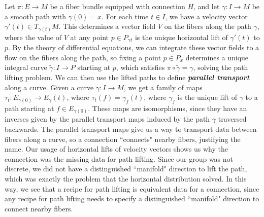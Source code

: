 \documentclass[abstract=on,twoside]{scrreprt}
\begin{document}
Let $\pi : E \to M$ be a fiber bundle equipped with connection $H$, and let
$\gamma : I \to M$ be a smooth path with $\gamma(0) = x$. For each time $t \in I$,
we have a velocity vector $\gamma'(t) \in T_{\gamma(t)}M$. This determines a vector
field $V$ on the fibers along the path $\gamma$, where the value of $V$ at any point
$p \in P_{\gamma{t}}$ is the unique horizontal lift of $\gamma'(t)$ to $p$. By
the theory of differential equations, we can integrate these vector fields to a flow
on the fibers along the path, so fixing a point $p \in P_x$ determines a
unique integral curve $\widetilde{\gamma} : I \to P$ starting at $p$, which satisfies
$\pi \circ \widetilde{\gamma} = \gamma$, solving the path lifting problem. We
can then use the lifted paths to define \textbf{\textit{parallel transport}} along
a curve. Given a curve $\gamma : I \to M$, we get a family of maps
$\tau_t : E_{\gamma(0)} \to E_{\gamma}(t)$, where $\tau_t(f) = \gamma_f(t)$, where
$\gamma_f$ is the unique lift of $\gamma$ to a path starting at $f \in E_{\gamma(0)}$.
These maps are isomorphisms, since they have an inverses given by the parallel transport
maps induced by the path $\gamma$ traversed backwards. The parallel transport
maps give us a way to transport data between fibers along a curve, so a connection
``connects" nearby fibers, justifying the name. Our usage of horizontal lifts of
velocity vectors shows us why the connection was the missing data for path lifting.
Since our group was not discrete, we did not have a distinguished ``manifold" direction
to lift the path, which was exactly the problem that the horizontal distribution solved.
In this way, we see that a recipe for path lifting is equivalent data for a connection,
since any recipe for path lifting needs to specify a distinguished ``manifold" direction
to connect nearby fibers.
\end{document}
